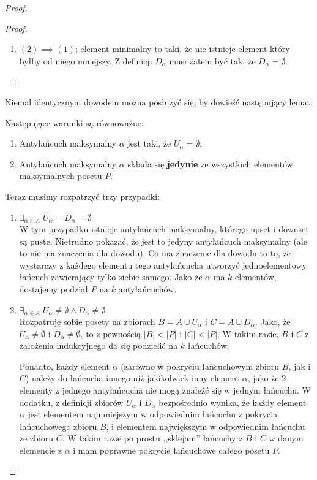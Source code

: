 \begin{proof}
\begin{proof}
\begin{enumerate}
			\item \( (2) \implies (1) \); element minimalny to taki, że nie istnieje element który byłby od niego mniejszy. Z definicji \(D_{\alpha}\) musi zatem być tak, że \(D_{\alpha} = \emptyset\).
		\end{enumerate}
	\end{proof}

	Niemal identycznym dowodem można posłużyć się, by dowieść następujący lemat:

	\begin{lemma}
		\label{dilworth-lemma-2}
		Następujące warunki są równoważne:

		\begin{enumerate}
			\item Antyłańcuch maksymalny \(\alpha\) jest taki, że \(U_{\alpha} = \emptyset\);
			\item Antyłańcuch maksymalny \(\alpha\) składa się \textbf{jedynie} ze wszystkich elementów maksymalnych posetu \(P\).
		\end{enumerate}
	\end{lemma}

	Teraz musimy rozpatrzyć trzy przypadki:
	\begin{enumerate}
		\item \( \exists_{\alpha \in A} \; U_{\alpha} = D_{\alpha} = \emptyset \) \\
		      W tym przypadku istnieje antyłańcuch maksymalny, którego upset i downset są puste. Nietrudno pokazać, że jest to jedyny antyłańcuch maksymalny (ale to nie ma znaczenia dla dowodu). Co ma znaczenie dla dowodu to to, że wystarczy z każdego elementu tego antyłańcucha utworzyć jednoelementowy łańcuch zawierający tylko siebie samego. Jako że \(\alpha\) ma \(k\) elementów, dostajemy podział \(P\) na \(k\) antyłańcuchów.

		\item \( \exists_{\alpha \in A} \; U_{\alpha} \not = \emptyset \wedge D_{\alpha} \not = \emptyset\) \\
		      Rozpatruję sobie posety na zbiorach \(B = A \cup U_{\alpha}\) i \(C = A \cup D_{\alpha}\). Jako, że \(U_{\alpha} \not = \emptyset\) i \(D_{\alpha} \not = \emptyset\), to z pewnością \( |B| < |P|\) i \( |C| < |P|\). W takim razie, \(B\) i \(C\) z założenia indukcyjnego da się podzielić na \(k\) łańcuchów.

		      Ponadto, każdy element \(\alpha\) (zarówno w pokryciu łańcuchowym zbioru \(B\), jak i \(C\)) należy do łańcucha innego niż jakikolwiek inny element \(\alpha\), jako że 2 elementy z jednego antyłańcucha nie mogą znaleźć się w jednym łańcuchu. W dodatku, z definicji zbiorów \(U_{\alpha}\) i \(D_{\alpha}\) bezpośrednio wynika, że każdy element \(\alpha\) jest elementem najmniejszym w odpowiednim łańcuchu z pokrycia łańcuchowego zbioru \(B\), i elementem największym w odpowiednim łańcuchu ze zbioru \(C\). W takim razie po prostu ,,sklejam'' łańcuchy z \(B\) i \(C\) w danym elemencie z \(\alpha\) i mam poprawne pokrycie łańcuchowe całego posetu \(P\).


\end{enumerate}
\end{proof}
